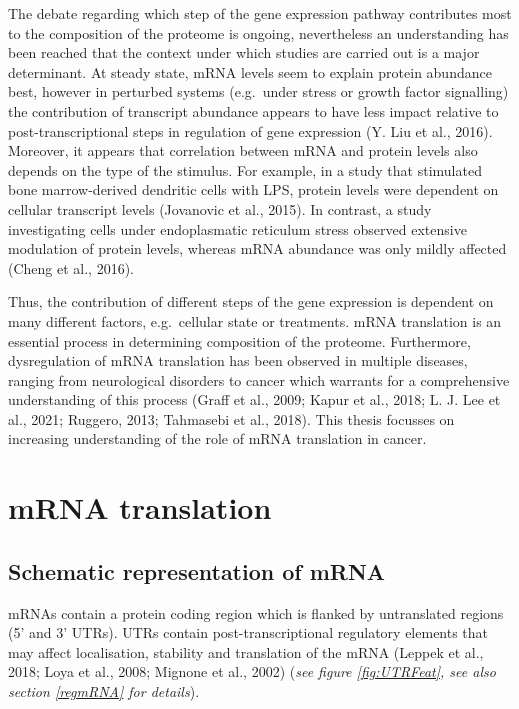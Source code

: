 \documentclass[12pt,openany]{book}
\begin{document}
The debate regarding which step of the gene expression pathway
contributes most to the composition of the proteome is ongoing,
nevertheless an understanding has been reached that the context under
which studies are carried out is a major determinant. At steady state,
mRNA levels seem to explain protein abundance best, however in perturbed
systems (e.g.~under stress or growth factor signalling) the contribution
of transcript abundance appears to have less impact relative to
post-transcriptional steps in regulation of gene expression (Y. Liu et
al., 2016). Moreover, it appears that correlation between mRNA and
protein levels also depends on the type of the stimulus. For example, in
a study that stimulated bone marrow-derived dendritic cells with LPS,
protein levels were dependent on cellular transcript levels (Jovanovic
et al., 2015). In contrast, a study investigating cells under
endoplasmatic reticulum stress observed extensive modulation of protein
levels, whereas mRNA abundance was only mildly affected (Cheng et al.,
2016).

Thus, the contribution of different steps of the gene expression is
dependent on many different factors, e.g.~cellular state or treatments.
mRNA translation is an essential process in determining composition of
the proteome. Furthermore, dysregulation of mRNA translation has been
observed in multiple diseases, ranging from neurological disorders to
cancer which warrants for a comprehensive understanding of this process
(Graff et al., 2009; Kapur et al., 2018; L. J. Lee et al., 2021;
Ruggero, 2013; Tahmasebi et al., 2018). This thesis focusses on
increasing understanding of the role of mRNA translation in cancer.
\newline
\section{mRNA translation} \subsection{Schematic representation of mRNA}
mRNAs contain a protein coding region which is flanked by untranslated
regions (5' and 3' UTRs). UTRs contain post-transcriptional regulatory
elements that may affect localisation, stability and translation of the
mRNA (Leppek et al., 2018; Loya et al., 2008; Mignone et al., 2002)
(\emph{see figure \ref{fig:UTRFeat}, see also section \ref{regmRNA} for
details}).
\end{document}
